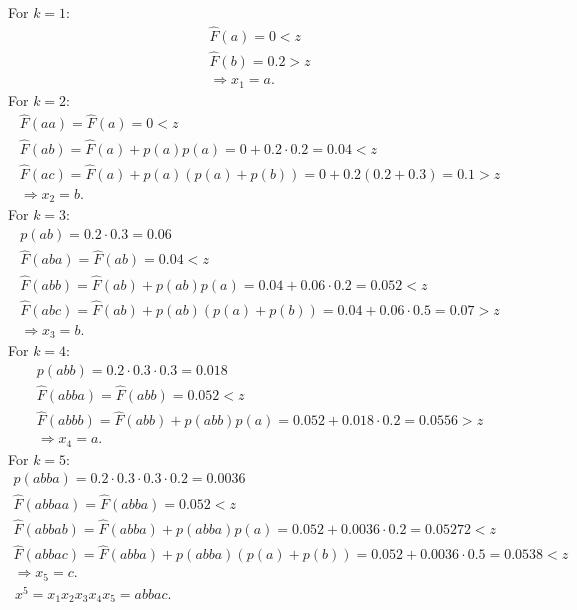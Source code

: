 \documentclass[
  coursecode={MTHE 477},
  assignmentname={Homework \homeworknumber},
  studentnumber=20053722,
  name={Bryan Hoang},
  draft,
  final,
]{
  ltxanswer%
}
\begin{document}
\begin{questions}
\begin{parts}
\begin{solution}
        For \(k = 1\):
        \begin{gather*}
          \hat{F}(a) = 0 < z\\
          \hat{F}(b) = 0.2 > z \\
          \Rightarrow x_{1} = a.
        \end{gather*}
        For \(k = 2\):
        \begin{gather*}
          \hat{F}(aa) = \hat{F}(a) = 0 < z\\
          \hat{F}(ab) = \hat{F}(a) + p(a)p(a) = 0 + 0.2 \cdot 0.2 = 0.04 < z \\
          \hat{F}(ac) = \hat{F}(a) + p(a)(p(a) + p(b)) = 0 + 0.2 (0.2 + 0.3)  = 0.1 > z \\
          \Rightarrow x_{2} = b.
        \end{gather*}
        For \(k = 3\):
        \begin{gather*}
          p(ab) = 0.2 \cdot 0.3 = 0.06 \\
          \hat{F}(aba) = \hat{F}(ab) = 0.04 < z \\
          \hat{F}(abb) = \hat{F}(ab) + p(ab)p(a) = 0.04 + 0.06 \cdot 0.2 = 0.052 < z \\
          \hat{F}(abc) = \hat{F}(ab) + p(ab)(p(a) + p(b)) = 0.04 + 0.06 \cdot 0.5 = 0.07 > z \\
          \Rightarrow x_{3} = b.
        \end{gather*}
        For \(k = 4\):
        \begin{gather*}
          p(abb) = 0.2 \cdot 0.3 \cdot 0.3 = 0.018 \\
          \hat{F}(abba) = \hat{F}(abb) = 0.052 < z\\
          \hat{F}(abbb) = \hat{F}(abb) + p(abb)p(a) = 0.052 + 0.018 \cdot 0.2 = 0.0556 > z \\
          \Rightarrow x_{4} = a.
        \end{gather*}
        For \(k = 5\):
        \begin{gather*}
          p(abba) = 0.2 \cdot 0.3 \cdot 0.3 \cdot 0.2 = 0.0036 \\
          \hat{F}(abbaa) = \hat{F}(abba) = 0.052 < z\\
          \hat{F}(abbab) = \hat{F}(abba) + p(abba)p(a) = 0.052 + 0.0036 \cdot 0.2 = 0.05272 < z \\
          \hat{F}(abbac) = \hat{F}(abba) + p(abba)(p(a) + p(b)) = 0.052 + 0.0036 \cdot 0.5 = 0.0538 < z \\
          \Rightarrow x_{5} = c.
        \end{gather*}
        \therefore\ \(\boxed{x^{5} = x_{1}x_{2}x_{3}x_{4}x_{5} = abbac}\).
      \end{solution}

      \part{}
      \begin{solution}
      \end{solution}
    \end{parts}
  \end{questions}
\end{document}
